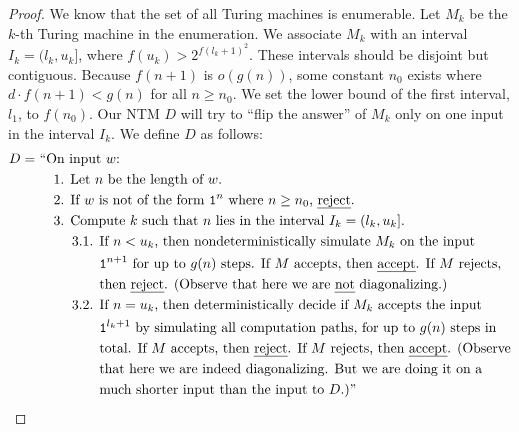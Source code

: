 \documentclass[11pt,twoside=off,numbers=noenddot]{scrbook}
\begin{document}
\begin{proof}
  We know that the set of all Turing machines is enumerable. Let $M_k$ be the $k$-th Turing machine in the enumeration. We associate $M_k$ with an interval $I_k = (l_k, u_k]$, where $f(u_k) > 2^{f(l_k + 1)^2}$. These intervals should be disjoint but contiguous. Because $f(n + 1)$ is $o(g(n))$, some constant $n_0$ exists where $d \cdot f(n + 1) < g(n)$ for all $n \geq n_0$. We set the lower bound of the first interval, $l_1$, to $f(n_0)$. Our NTM $D$ will try to ``flip the answer'' of $M_k$ only on one input in the interval $I_k$. We define $D$ as follows:
  \begin{align*}
    D = & \ \text{``On input $w$:} \\
    & \ \quad \text{1. } \text{Let $n$ be the length of $w$.} \\
    & \ \quad \text{2. } \text{If $w$ is not of the form $\texttt{1}^n$ where $n \geq n_0$, \emph{reject}.} \\
    & \ \quad \text{3. } \text{Compute $k$ such that $n$ lies in the interval $I_k = (l_k, u_k]$.} \\
    & \ \quad \ \quad \text{3.1. } \text{If $n < u_k$, then nondeterministically simulate $M_k$ on the input} \\
    & \ \quad \ \quad \phantom{\text{3.1. }} \text{$\texttt{1}^{n + 1}$ for up to $g(n)$ steps. If $M$ accepts, then \emph{accept}. If $M$ rejects,} \\
    & \ \quad \ \quad \phantom{\text{3.1. }} \text{then \emph{reject}. (Observe that here we are \emph{not} diagonalizing.)} \\
    & \ \quad \ \quad \text{3.2. } \text{If $n = u_k$, then deterministically decide if $M_k$ accepts the input} \\
    & \ \quad \ \quad \phantom{\text{3.2. }} \text{$\texttt{1}^{l_k + 1}$ by simulating all computation paths, for up to $g(n)$ steps in} \\
    & \ \quad \ \quad \phantom{\text{3.2. }} \text{total. If $M$ accepts, then \emph{reject}. If $M$ rejects, then \emph{accept}. (Observe} \\
      & \ \quad \ \quad \phantom{\text{3.2. }} \text{that here we are indeed diagonalizing. But we are doing it on a} \\
    & \ \quad \ \quad \phantom{\text{3.2. }} \text{much shorter input than the input to $D$.)''}
  \end{align*}

\end{proof}
\end{document}
